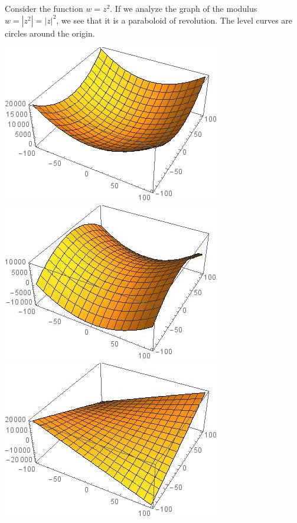 \begin{example}
    Consider the function $w = z^2$. If we analyze the graph of the modulus $w = |z^2| = |z|^2$, we see that it is a paraboloid of revolution. The level curves are circles around the origin.
    \begin{center}
    \includegraphics[scale = 0.3]{complexz2abssurface}
    \includegraphics[scale = 0.3]{complexz2resurface}
    \includegraphics[scale = 0.3]{complexz2imsurface}


\end{center}
\end{example}

